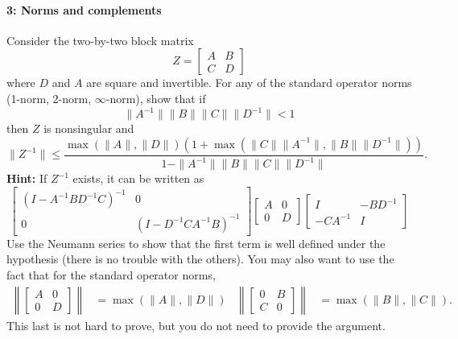 \documentclass[12pt, leqno]{article}
\begin{document}
\paragraph*{3: Norms and complements}
Consider the two-by-two block matrix
\[
Z = \begin{bmatrix} A & B \\ C & D \end{bmatrix}
\]
where $D$ and $A$ are square and invertible.  For any of the standard
operator norms (1-norm, 2-norm, $\infty$-norm), show that if
\[
  \|A^{-1}\| \|B\| \|C\| \|D^{-1}\| < 1
\]
then $Z$ is nonsingular and
\[
\|Z^{-1}\| \leq
\frac{\max(\|A\|, \|D\|)
     (1+\max(\|C\| \|A^{-1}\|, \|B\| \|D^{-1}\|))}
     {1-\|A^{-1}\|\|B\|\|C\|\|D^{-1}\|}.
\]
{\bf Hint:} If $Z^{-1}$ exists, it can be written as
\[
\begin{bmatrix} (I-A^{-1} B D^{-1} C)^{-1} & 0 \\ 0 & (I-D^{-1} C A^{-1} B)^{-1} \end{bmatrix}
\begin{bmatrix} A & 0 \\ 0 & D \end{bmatrix}
\begin{bmatrix} I & -BD^{-1} \\ -CA^{-1} & I \end{bmatrix}
\]
Use the Neumann series to show that the first term is well defined
under the hypothesis (there is no trouble with the others).  You may
also want to use the fact that for the standard operator norms,
\begin{align*}
\left\| \begin{bmatrix} A & 0 \\ 0 & D \end{bmatrix} \right\| &=
\max(\|A\|, \|D\|) &
\left\| \begin{bmatrix} 0 & B \\ C & 0 \end{bmatrix} \right\| &=
\max(\|B\|, \|C\|).
\end{align*}
This last is not hard to prove, but you do not need to provide the
argument.
\end{document}
